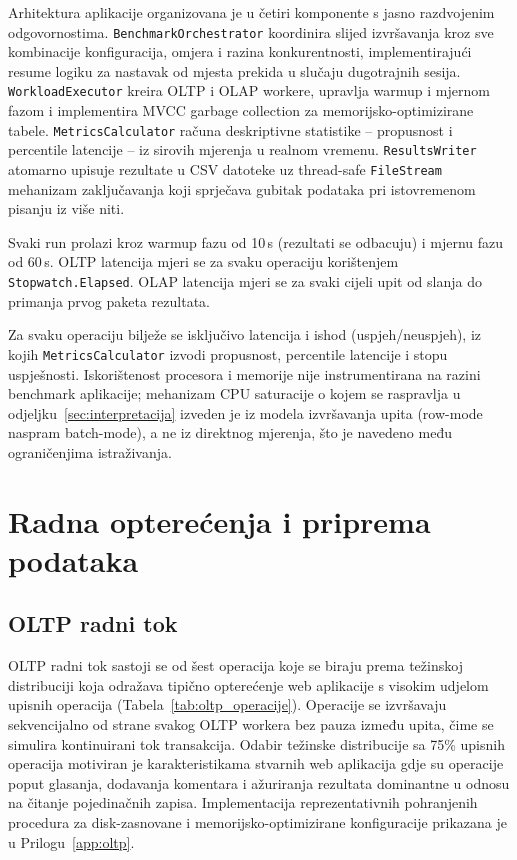 Arhitektura aplikacije organizovana je u četiri komponente s jasno razdvojenim odgovornostima. \texttt{BenchmarkOrchestrator} koordinira slijed izvršavanja kroz sve kombinacije konfiguracija, omjera i razina konkurentnosti, implementirajući resume logiku za nastavak od mjesta prekida u slučaju dugotrajnih sesija. \texttt{WorkloadExecutor} kreira OLTP i OLAP workere, upravlja warmup i mjernom fazom i implementira MVCC garbage collection za memorijsko-optimizirane tabele. \texttt{MetricsCalculator} računa deskriptivne statistike -- propusnost i percentile latencije -- iz sirovih mjerenja u realnom vremenu. \texttt{ResultsWriter} atomarno upisuje rezultate u CSV datoteke uz thread-safe \texttt{FileStream} mehanizam zaključavanja koji sprječava gubitak podataka pri istovremenom pisanju iz više niti.

Svaki run prolazi kroz warmup fazu od 10\,s (rezultati se odbacuju) i mjernu fazu od 60\,s. OLTP latencija mjeri se za svaku operaciju korištenjem \mbox{\texttt{Stopwatch.Elapsed}}. OLAP latencija mjeri se za svaki cijeli upit od slanja do primanja prvog paketa rezultata.

Za svaku operaciju bilježe se isključivo latencija i ishod (uspjeh/neuspjeh), iz kojih \texttt{MetricsCalculator} izvodi propusnost, percentile latencije i stopu uspješnosti. Iskorištenost procesora i memorije nije instrumentirana na razini benchmark aplikacije; mehanizam CPU saturacije o kojem se raspravlja u odjeljku~\ref{sec:interpretacija} izveden je iz modela izvršavanja upita (row-mode naspram batch-mode), a ne iz direktnog mjerenja, što je navedeno među ograničenjima istraživanja.

\section{Radna opterećenja i priprema podataka}
\label{sec:radna_opterecenja}

\subsection{OLTP radni tok}

OLTP radni tok sastoji se od šest operacija koje se biraju prema težinskoj distribuciji koja odražava tipično opterećenje web aplikacije s visokim udjelom upisnih operacija (Tabela~\ref{tab:oltp_operacije}). Operacije se izvršavaju sekvencijalno od strane svakog OLTP workera bez pauza između upita, čime se simulira kontinuirani tok transakcija. Odabir težinske distribucije sa 75\% upisnih operacija motiviran je karakteristikama stvarnih web aplikacija gdje su operacije poput glasanja, dodavanja komentara i ažuriranja rezultata dominantne u odnosu na čitanje pojedinačnih zapisa. Implementacija reprezentativnih pohranjenih procedura za disk-zasnovane i memorijsko-optimizirane konfiguracije prikazana je u Prilogu~\ref{app:oltp}.

